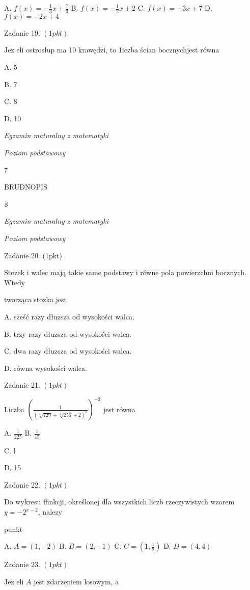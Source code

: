 \documentclass[a4paper,12pt]{article}
\begin{document}
A. $f(x)=-\displaystyle \frac{1}{3}x+\frac{7}{3}$ B. $f(x)=-\displaystyle \frac{1}{2}x+2$ C. $f(x)=-3x+7$ D. $f(x)=-2x+4$

Zadanie 19. $(1pkt)$

$\mathrm{J}\mathrm{e}\dot{\mathrm{z}}$ eli ostrosłup ma 10 krawędzi, to 1iczba ścian bocznychjest równa

A. 5

B. 7

C. 8

D. 10





{\it Egzamin maturalny z matematyki}

{\it Poziom podstawowy}

7

BRUDNOPIS





{\it 8}

{\it Egzamin maturalny z matematyki}

{\it Poziom podstawowy}

Zadanie 20. (1pkt)

Stozek i walec mają takie same podstawy i równe pola powierzchni bocznych. Wtedy

tworząca stozka jest

A. sześć razy dłuzsza od wysokości walca.

B. trzy razy dłuzsza od wysokości walca.

C. dwa razy dłuzsza od wysokości walca.

D. równa wysokości walca.

Zadanie 21. $(1pkt)$

Liczba $(\displaystyle \frac{1}{(\sqrt[3]{729}+\sqrt[4]{256}+2)^{0}})^{-2}$ jest równa

A. $\displaystyle \frac{1}{225}$ B. $\displaystyle \frac{1}{15}$

C. l

D. 15

Zadanie 22. $(1pkt)$

Do wykresu ffinkcji, określonej dla wszystkich liczb rzeczywistych wzorem $y=-2^{x-2}$, nalez$\mathrm{y}$

punkt

A. $A=(1,-2)$ B. $B=(2,-1)$ C. $C=(1,\displaystyle \frac{1}{2})$ D. $D=(4,4)$

Zadanie 23. $(1pkt)$

$\mathrm{J}\mathrm{e}\dot{\mathrm{z}}$ eli $A$ jest zdarzeniem losowym, $\mathrm{a}$
\end{document}
